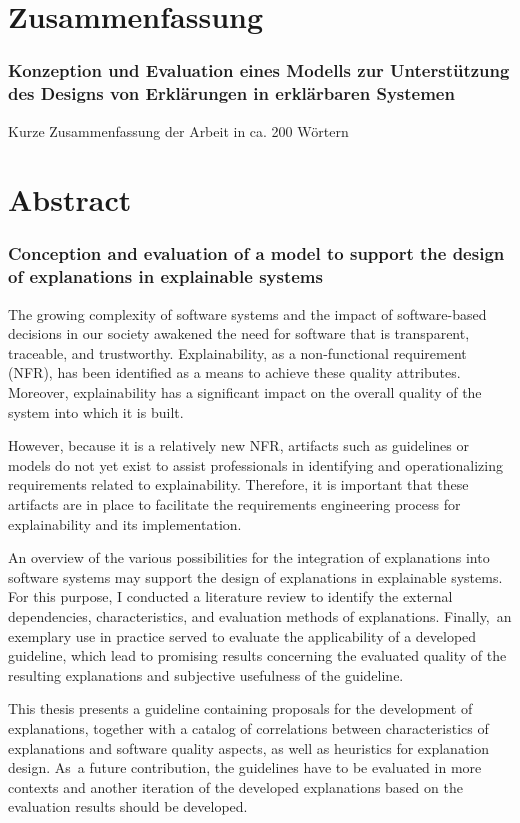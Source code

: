 \chapter*{Zusammenfassung}

\subsection*{Konzeption und Evaluation eines Modells zur Unterstützung des Designs von Erklärungen in erklärbaren Systemen}

Kurze Zusammenfassung der Arbeit in ca. 200 Wörtern

\clearpage

\chapter*{Abstract}

\subsection*{Conception and evaluation of a model to support the design of explanations in explainable systems}

The growing complexity of software systems and the impact of software-based decisions in our society awakened the need for software that is transparent, traceable, and trustworthy. Explainability, as a non-functional requirement (NFR), has been identified as a means to achieve these quality attributes. Moreover, explainability has a significant impact on the overall quality of the system into which it is built.

However, because it is a relatively new NFR, artifacts such as guidelines or models do not yet exist to assist professionals in identifying and operationalizing requirements related to explainability. Therefore, it is important that these artifacts are in place to facilitate the requirements engineering process for explainability and its implementation.

An overview of the various possibilities for the integration of explanations into software systems may support the design of explanations in explainable systems. For this purpose, I conducted a literature review to identify the external dependencies, characteristics, and evaluation methods of explanations. Finally, an exemplary use in practice served to evaluate the applicability of a developed guideline, which lead to promising results concerning the evaluated quality of the resulting explanations and subjective usefulness of the guideline. 

This thesis presents a guideline containing proposals for the development of explanations, together with a catalog of correlations between characteristics of explanations and software quality aspects, as well as heuristics for explanation design. As a future contribution, the guidelines have to be evaluated in more contexts and another iteration of the developed explanations based on the evaluation results should be developed.

\clearpage